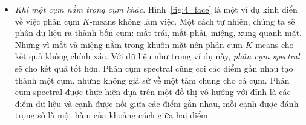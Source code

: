 \begin{itemize}
\item \textit{Khi một cụm nằm trong cụm khác}.
Hình~\ref{fig:4_face} là một ví dụ kinh điển về việc phân cụm $K$-means
không làm việc. Một cách tự nhiên, chúng ta sẽ phân dữ liệu ra thành bốn
cụm: mắt trái, mắt phải, miệng, xung quanh mặt. Nhưng vì mắt và miệng nằm
trong khuôn mặt nên phân cụm $K$-means cho kết quả không chính xác. Với dữ
liệu như trong ví dụ này, \textit{phân cụm
spectral}~\cite{von2007tutorial,ng2002spectral} sẽ cho kết quả tốt hơn. Phân
cụm spectral cũng coi các điểm gần nhau tạo thành một cụm, nhưng không giả
sử về một tâm chung cho cả cụm. Phân cụm spectral được thực hiện dựa trên
một đồ thị vô hướng với đỉnh là các điểm dữ liệu và cạnh được nối giữa các
điểm gần nhau, mỗi cạnh được đánh trọng số là một hàm của khoảng cách giữa
hai điểm.


\end{itemize}


